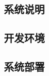 \documentclass[fontset=windows]{ctexart}
\numberwithin{figure}{section}		%
\begin{document}
\newpage
\begin{appendices}
	\section{系统说明}

	\subsection{开发环境}

	\subsection{系统部署}

\end{appendices}
\end{document}
